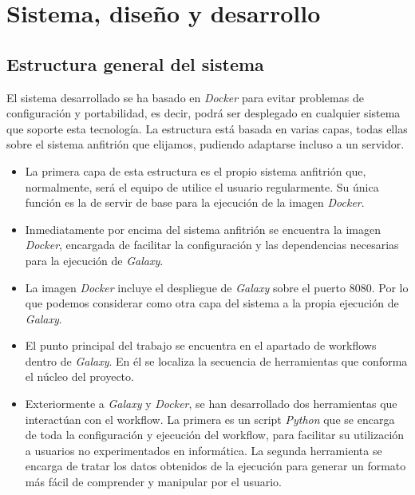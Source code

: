 \chapter{Sistema, diseño y desarrollo}
\label{chap:sistemadesarrollado}

\section{Estructura general del sistema}

El sistema desarrollado se ha basado en \textit{Docker} para evitar problemas de configuración y portabilidad, es decir, podrá ser desplegado en cualquier sistema que soporte esta tecnología. La estructura está basada en varias capas, todas ellas sobre el sistema anfitrión que elijamos, pudiendo adaptarse incluso a un servidor. 

\begin{itemize}
\item La primera capa de esta estructura es el propio sistema anfitrión que, normalmente, será el equipo de utilice el usuario regularmente. Su única función es la de servir de base para la ejecución de la imagen {\itshape{Docker}}.
\item Inmediatamente por encima del sistema anfitrión se encuentra la imagen {\itshape{Docker}}, encargada de facilitar la configuración y las dependencias necesarias para la ejecución de {\itshape{Galaxy}}.
\item La imagen {\itshape{Docker}} incluye el despliegue de {\itshape{Galaxy}} sobre el puerto 8080. Por lo que podemos considerar como otra capa del sistema a la propia ejecución de {\itshape{Galaxy}}.
\item El punto principal del trabajo se encuentra en el apartado de workflows dentro de {\itshape{Galaxy}}. En él se localiza la secuencia de herramientas que conforma el núcleo del proyecto.
\item Exteriormente a {\itshape{Galaxy}} y {\itshape{Docker}}, se han desarrollado dos herramientas que interactúan con el workflow. La primera es un script {\itshape{Python}} que se encarga de toda la configuración y ejecución del workflow, para facilitar su utilización a usuarios no experimentados en informática. La segunda herramienta se encarga de tratar los datos obtenidos de la ejecución para generar un formato más fácil de comprender y manipular por el usuario.
\end{itemize}

